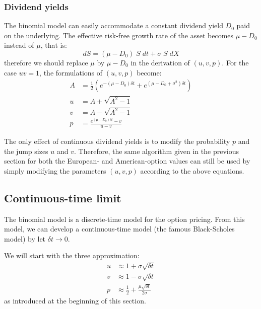 \subsubsection{Dividend yields}
The binomial model can easily accommodate a constant dividend yield $D_0$ paid on the underlying. The effective risk-free growth rate of the asset becomes $\mu - D_0$ instead of $\mu$, that is:
\begin{equation}
    dS = \left( \mu - D_0 \right) \; S \; dt + \sigma \; S \; dX
\end{equation}
therefore we should replace $\mu$ by $\mu - D_0$ in the derivation of $(u,v,p)$. For the case $uv = 1$, the formulations of $(u,v,p)$ become:
\begin{align}
    A &= \frac{1}{2} \left( e^{-\left( \mu - D_0 \right) \delta t} + e^{\left( \mu - D_0 + \sigma^2 \right)\delta t} \right) \\
    u &= A + \sqrt{A^2 - 1} \\
    v &= A - \sqrt{A^2 - 1} \\
    p &= \frac{e^{\left( \mu - D_0 \right) \delta t} - v}{u - v}
\end{align}

The only effect of continuous dividend yields is to modify the probability $p$ and the jump sizes $u$ and $v$. Therefore, the same algorithm given in the previous section for both the European- and American-option values can still be used by simply modifying the parameters $(u,v,p)$ according to the above equations. 


\subsection{Continuous-time limit}
The binomial model is a discrete-time model for the option pricing. From this model, we can develop a continuous-time model (the famous Black-Scholes model) by let $\delta t \rightarrow 0$. 

We will start with the three approximation:
\begin{align*}
    u &\approx 1 + \sigma \sqrt{\delta t} \\
    v &\approx 1 - \sigma \sqrt{\delta t} \\
    p &\approx \frac{1}{2} + \frac{\mu \sqrt{\delta t}}{2 \sigma}    
\end{align*}
as introduced at the beginning of this section.


